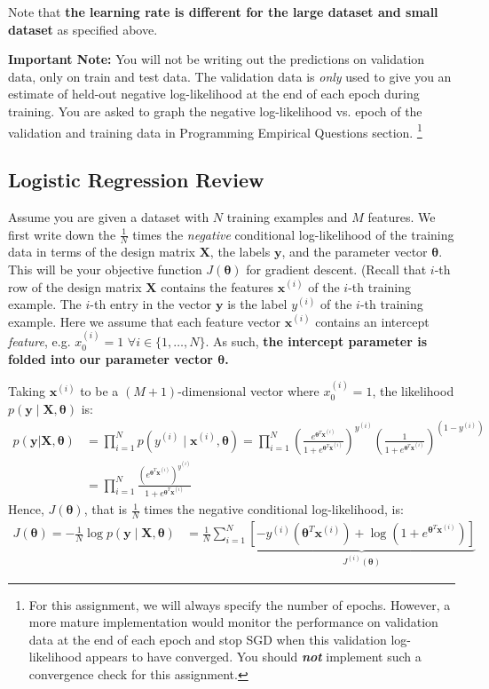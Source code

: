 \documentclass[11pt,addpoints,answers]{exam}
\newcommand{\xv}{\mathbf{x}}
\newcommand{\yv}{\mathbf{y}}
\newcommand{\Xv}{\mathbf{X}}
\newcommand{\thetav     }{\boldsymbol \theta     }
\begin{document}
Note that \textbf{the learning rate is different for the large dataset and small dataset} as specified above.

\begin{notebox}
{\bf Important Note:} You will not be writing out the predictions on validation data, only on train and test data. The validation data is \emph{only} used to give you an estimate of held-out negative log-likelihood at the end of each epoch during training. You are asked to graph the negative log-likelihood vs. epoch of the validation and training data in Programming Empirical Questions section. \footnote{For this assignment, we will always specify the number of epochs. However, a more mature implementation would monitor the performance on validation data at the end of each epoch and stop SGD when this validation log-likelihood appears to have converged. You should \textbf{\emph{not}} implement such a convergence check for this assignment.} 
\end{notebox}

\subsection{Logistic Regression Review}\label{lrreview}

 Assume you are given a dataset with $N$ training examples and $M$ features. We first write down the $\frac{1}{N}$ times the \emph{negative} conditional log-likelihood of the training data in terms of the design matrix $\Xv$, the labels $\yv$, and the parameter vector $\thetav$. This will be your objective function $J(\thetav)$ for gradient descent. 
%
(Recall that $i$-th row of the design matrix $\Xv$ contains the features $\xv^{(i)}$ of the $i$-th training example. The $i$-th entry in the vector $\yv$ is the label $y^{(i)}$ of the $i$-th training example.  Here we assume that each feature vector $\xv^{(i)}$ contains an intercept \emph{feature}, e.g. $x_0^{(i)} = 1 \,\,\forall i \in \{1,\ldots,N\}$. As such, \textbf{the intercept parameter is folded into our parameter vector $\thetav$.}


Taking $\xv^{\left(i\right)}$ to be a $(M+1)$-dimensional vector where $x^{(i)}_0=1$, the likelihood $p\left(\yv \mid \mathbf{X},\thetav\right)$ is:
\begin{align}
     p(\yv |\mathbf{X},\thetav) &= \prod_{i = 1}^N p(y^{(i)} \mid  \xv^{(i)}, \thetav) = \prod_{i = 1}^N \left(\frac{e^{\thetav^T\xv^{\left(i\right)}}}{1+e^{\thetav^T\xv^{\left(i\right)}}}\right)^{y^{(i)}}\left(\frac{1}{1+e^{\thetav^T\xv^{\left(i\right)}}}\right)^{\left(1-y^{(i)}\right)}\\
    &= \prod_{i=1}^N \frac{\left(e^{\thetav^T\xv^{\left(i\right)}}\right)^{y^{(i)}}}{1+e^{\thetav^T\xv^{\left(i\right)}}}
\end{align}
Hence, $J(\thetav)$, that is $\frac{1}{N}$ times the negative conditional log-likelihood, is:
\begin{align}
    J(\thetav)= - \frac{1}{N} \log p\left(\yv \mid \mathbf{X},\thetav\right) &= \frac{1}{N}\sum_{i=1}^N \underbrace{\left[ -y^{(i)}\left(\thetav^T\xv^{\left(i\right)}\right)+\log\left(1+e^{\thetav^T\xv^{\left(i\right)}}\right)\right]}_{J^{(i)}(\thetav)}
\end{align}
\end{document}
